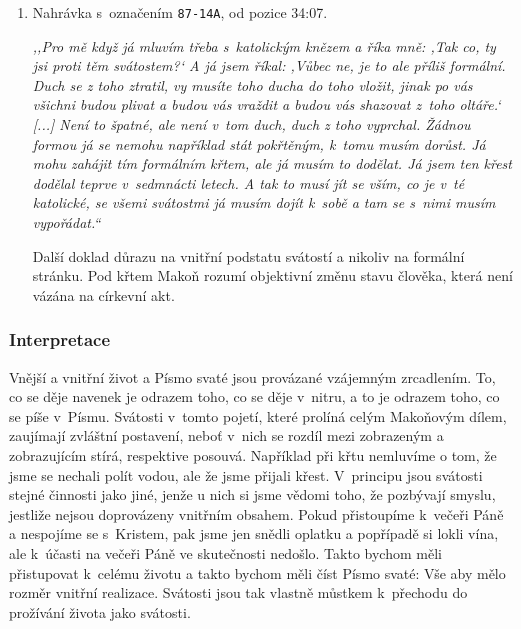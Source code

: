 \begin{enumerate}
{Zde opět typičtější Makoňův přístup. Výpověď, že svátost má vést k~poznání,
        považuji za nesamozřejmou.

}

\item{
Nahrávka s~označením \texttt{87-14A}, od pozice 34:07.

\textit{%
,,Pro mě když já mluvím třeba s~katolickým knězem a říka mně: ,Tak co, ty jsi
proti těm svátostem?{}` A já jsem říkal: ,Vůbec ne, je to ale příliš formální.
Duch se z toho ztratil, vy musíte toho ducha do toho vložit, jinak po vás
všichni budou plivat a budou vás vraždit a budou vás shazovat z~toho oltáře.`
[...] %
Není to špatné, ale není v~tom duch, duch z toho vyprchal. Žádnou formou já se
nemohu například stát pokřtěným, k~tomu musím dorůst. Já mohu zahájit tím
formálním křtem, ale já musím to dodělat. Já jsem ten křest dodělal teprve
v~sedmnácti letech. A tak to musí jít se vším, co je v~té katolické, se všemi
svátostmi já musím dojít k~sobě a tam se s~nimi musím vypořádat.``
}

Další doklad důrazu na vnitřní podstatu svátostí a nikoliv na formální stránku.
Pod křtem Makoň rozumí objektivní změnu stavu člověka, která není vázána na
církevní akt.

}

\end{enumerate}

\subsubsection*{Interpretace}

Vnější a vnitřní život a Písmo svaté jsou provázané vzájemným zrcadlením. To, co
se děje navenek je odrazem toho, co se děje v~nitru, a to je odrazem toho, co se
píše v~Písmu. Svátosti v~tomto pojetí, které prolíná celým Makoňovým dílem,
zaujímají zvláštní postavení, neboť v~nich se rozdíl mezi zobrazeným a
zobrazujícím stírá, respektive posouvá. Například při křtu nemluvíme o tom, že
jsme se nechali polít vodou, ale že jsme přijali křest. V~principu jsou svátosti
stejné činnosti jako jiné, jenže u nich si jsme vědomi toho, že pozbývají
smyslu, jestliže nejsou doprovázeny vnitřním obsahem. Pokud přistoupíme k~večeři
Páně a nespojíme se s~Kristem, pak jsme jen snědli oplatku a popřípadě si lokli
vína, ale k~účasti na večeři Páně ve skutečnosti nedošlo. Takto bychom měli
přistupovat k~celému životu a takto bychom měli číst Písmo svaté: Vše aby mělo
rozměr vnitřní realizace. Svátosti jsou tak vlastně můstkem k~přechodu do
prožívání života jako svátosti.


